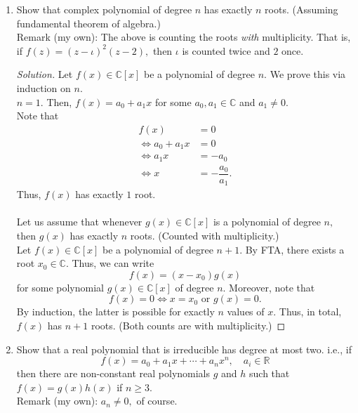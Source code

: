 \documentclass[12pt]{article}
\theoremstyle{definition}
\numberwithin{thm}{section}
\newenvironment{soln}{\begin{proof}[Solution]}{\end{proof}}
\begin{document}
\begin{enumerate}
	\item  Show that complex polynomial of degree $n$ has exactly $n$ roots. (Assuming fundamental theorem of algebra.)\\
	Remark (my own): The above is counting the roots \emph{with} multiplicity. That is, if $f(z) = (z - \iota)^2(z - 2),$ then $\iota$ is counted twice and $2$ once.
	\begin{soln}
		Let $f(x) \in \mathbb{C}[x]$ be a polynomial of degree $n.$
		We prove this via induction on $n.$\\
		$n = 1.$ Then, $f(x) = a_0 + a_1x$ for some $a_0, a_1 \in \mathbb{C}$ and $a_1 \neq 0.$\\
		Note that
		\begin{align*} 
			f(x) &= 0\\
			\iff a_0 + a_1x &= 0\\
			\iff a_1x &= -a_0\\
			\iff x &= -\dfrac{a_0}{a_1}.
		\end{align*}
		Thus, $f(x)$ has exactly $1$ root.\\~\\
		Let us assume that whenever $g(x) \in \mathbb{C}[x]$ is a polynomial of degree $n,$ then $g(x)$ has exactly $n$ roots. (Counted with multiplicity.)\\
		Let $f(x) \in \mathbb{C}[x]$ be a polynomial of degree $n + 1.$ By FTA, there exists a root $x_0 \in \mathbb{C}.$ Thus, we can write
		\begin{equation*} 
			f(x) = (x - x_0)g(x)
		\end{equation*}
		for some polynomial $g(x) \in \mathbb{C}[x]$ of degree $n.$ Moreover, note that 
		\begin{equation*} 
			f(x) = 0 \iff x = x_0 \text{ or } g(x) = 0.
		\end{equation*}
		By induction, the latter is possible for exactly $n$ values of $x.$ Thus, in total, $f(x)$ has $n + 1$ roots. (Both counts are with multiplicity.)
	\end{soln}
	\item Show that a real polynomial that is irreducible has degree at most two. i.e., if
	\begin{equation*} 
		f(x) = a_0 + a_1x + \cdots + a_nx^n, \quad a_i \in \mathbb{R}
	\end{equation*}
	then there are non-constant real polynomials $g$ and $h$ such that $f(x) = g(x)h(x)$ if $n \ge 3.$\\
	Remark (my own): $a_n \neq 0,$ of course.

\end{enumerate}
\end{document}
